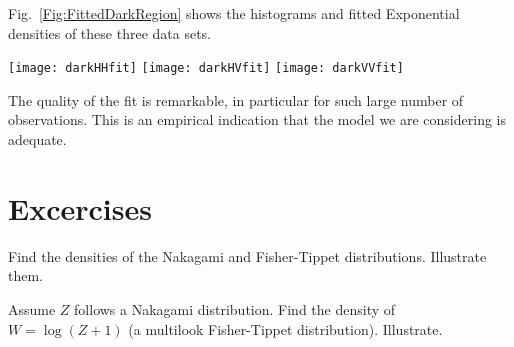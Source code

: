 Fig.~\ref{Fig:FittedDarkRegion} shows the histograms and fitted Exponential densities of these three data sets.

\begin{figure*}
\centering
\texttt{[image: darkHHfit]}
\texttt{[image: darkHVfit]}
\texttt{[image: darkVVfit]}
\caption{Histograms and fitted Exponential densities over the dark region of Fig.~\ref{Im:Oberpfaffenhofen_RGB}}\label{Fig:FittedDarkRegion}
\end{figure*}

The quality of the fit is remarkable, in particular for such large number of observations.
This is an empirical indication that the model we are considering is adequate.



\section*{Excercises}

\begin{exer}
Find the densities of the Nakagami and Fisher-Tippet distributions.
Illustrate them.
\end{exer}

\begin{exer}
Assume $Z$ follows a Nakagami distribution.
Find the density of $W=\log(Z+1)$ (a multilook Fisher-Tippet distribution).
Illustrate.
\end{exer}
